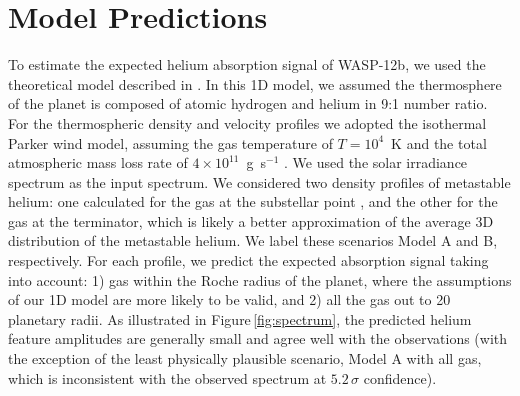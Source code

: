 \documentclass[RNAAS]{aastex62}
\begin{document}
\section{Model Predictions}
To estimate the expected helium absorption signal of WASP-12b,
we used the theoretical model described in \cite{oklopcic18}.
In this 1D model, we assumed the thermosphere of the planet is composed of atomic hydrogen and helium in 9:1 number
ratio. For the thermospheric density and velocity profiles we adopted the
isothermal Parker wind model, assuming the gas temperature of $T=10^4$~K and the
total atmospheric mass loss rate of $4\times 10^{11}$~g~s$^{-1}$ \citep[based on
the results of hydrodynamic simulations of atmospheric escape in WASP-12b
by][]{salz16}. We used the solar irradiance spectrum as the input spectrum. 
We considered two density profiles of metastable helium: one calculated for the
gas at the substellar point \citep[as in][]{oklopcic18}, and the other for the
gas at the terminator, which is likely a better approximation of the average 3D
distribution of the metastable helium. We label these scenarios Model A and B,
respectively. For each profile, we predict the expected absorption signal taking into account: 1) gas within the Roche radius of the planet, where the assumptions of our 1D model are more likely to be valid, and 2) all the gas out to 20 planetary radii. 
As illustrated in Figure\,\ref{fig:spectrum}, the predicted helium feature
amplitudes are generally small and agree well with the observations (with the
exception of the least physically plausible scenario, Model A with all gas,
which is inconsistent with the observed spectrum at $5.2\,\sigma$ confidence). 

\end{document}
